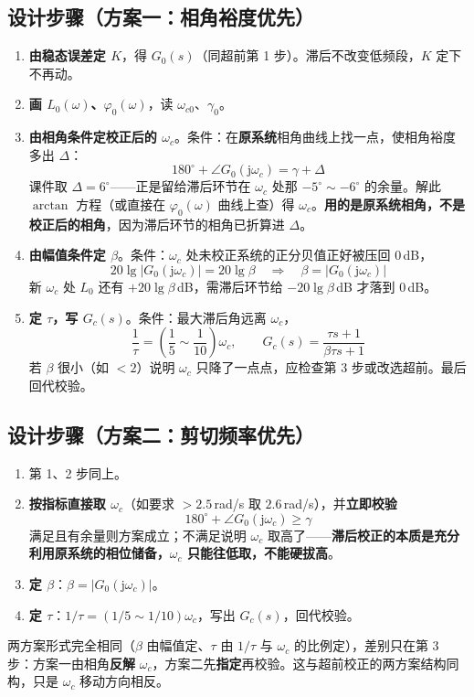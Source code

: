\subsection{设计步骤（方案一：相角裕度优先）}
\begin{enumerate}
    \item \textbf{由稳态误差定 $K$}，得 $G_0(s)$（同超前第 1 步）。滞后不改变低频段，$K$ 定下不再动。
    \item \textbf{画 $L_0(\omega)$、$\varphi_0(\omega)$}，读 $\omega_{c0}$、$\gamma_0$。
    \item \textbf{由相角条件定校正后的 $\omega_c$}。条件：在\textbf{原系统}相角曲线上找一点，使相角裕度多出 $\Delta$：
    \[
    180^\circ+\angle G_0(\mathrm{j}\omega_c)=\gamma+\Delta
    \]
    课件取 $\Delta=6^\circ$——正是留给滞后环节在 $\omega_c$ 处那 $-5^\circ\sim-6^\circ$ 的余量。解此 $\arctan$ 方程（或直接在 $\varphi_0(\omega)$ 曲线上查）得 $\omega_c$。\textbf{用的是原系统相角，不是校正后的相角}，因为滞后环节的相角已折算进 $\Delta$。
    \item \textbf{由幅值条件定 $\beta$}。条件：$\omega_c$ 处未校正系统的正分贝值正好被压回 $0$\,dB，
    \[
    20\lg\bigl|G_0(\mathrm{j}\omega_c)\bigr|=20\lg\beta\quad\Longrightarrow\quad \beta=\bigl|G_0(\mathrm{j}\omega_c)\bigr|
    \]
    新 $\omega_c$ 处 $L_0$ 还有 $+20\lg\beta$\,dB，需滞后环节给 $-20\lg\beta$\,dB 才落到 $0$\,dB。
    \item \textbf{定 $\tau$，写 $G_c(s)$}。条件：最大滞后角远离 $\omega_c$，
    \[
    \frac1\tau=\left(\frac15\sim\frac1{10}\right)\omega_c,\qquad
    G_c(s)=\frac{\tau s+1}{\beta\tau s+1}
    \]
    若 $\beta$ 很小（如 $<2$）说明 $\omega_c$ 只降了一点点，应检查第 3 步或改选超前。最后回代校验。
\end{enumerate}

\subsection{设计步骤（方案二：剪切频率优先）}
\begin{enumerate}
    \item 第 1、2 步同上。
    \item \textbf{按指标直接取 $\omega_c$}（如要求 $>2.5$\,rad/s 取 $2.6$\,rad/s），并\textbf{立即校验}
    \[
    180^\circ+\angle G_0(\mathrm{j}\omega_c)\ge\gamma
    \]
    满足且有余量则方案成立；不满足说明 $\omega_c$ 取高了——\textbf{滞后校正的本质是充分利用原系统的相位储备，$\omega_c$ 只能往低取，不能硬拔高}。
    \item \textbf{定 $\beta$}：$\beta=|G_0(\mathrm{j}\omega_c)|$。
    \item \textbf{定 $\tau$}：$1/\tau=(1/5\sim1/10)\omega_c$，写出 $G_c(s)$，回代校验。
\end{enumerate}
两方案形式完全相同（$\beta$ 由幅值定、$\tau$ 由 $1/\tau$ 与 $\omega_c$ 的比例定），差别只在第 3 步：方案一由相角\textbf{反解} $\omega_c$，方案二先\textbf{指定}再校验。这与超前校正的两方案结构同构，只是 $\omega_c$ 移动方向相反。

